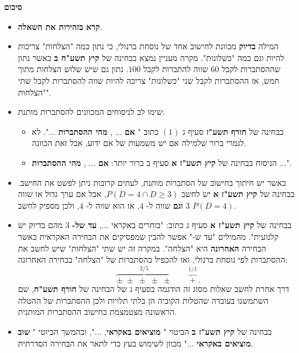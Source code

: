 \documentclass[12pt,a4paper]{article}
\begin{document}

\newpage

\begin{center}
\textbf{סיכום}
\end{center}

\begin{itemize}
\item
\textbf{קרא בזהירות את השאלה}.

\item
המילה 
\textbf{בדיוק}
מכוונת לחישוב אחד של נוסחת ברנולי, כי נתון כמה "הצלחות" צריכות להיות וגם כמה "כשלונות". מקרה מעניין נמצא בבחינה של
\textbf{קיץ תשע"ח ב}
כאשר נתון שההסתברות לקבל 
$60$
שווה להתברות לקבל
$100$.
נתון גם שיש שלוש הצלחות מתוך חמש, אז ההסתברות לקבל שני "כשלונות" צריכה להיות שווה להסתברות לקבל שתי "הצלחות".

\item
שימו לב לניסוחים המכוונים להסתברות מותנת:
\begin{itemize}
\item
בבחינה של
\textbf{חורף תשע"ז}
סעיף ג
$(1)$
כתוב "%
\textbf{אם} $\ldots$ ,
\textbf{מהי ההסתברות} $\ldots$".
לא לגמרי ברור שלמילה אם יש משמעות של אם ידוע, אבל זאת הכוונה.
\item
הניסוח בבחינה של
\textbf{קיץ תשע"ז א}
סעיף ב ברור יותר:
\textbf{אם} $\ldots$ ,
\textbf{מהי ההסתברות} $\ldots$".
\end{itemize}

\item
כאשר יש חיתוך בחישוב של הסתברות מותנת, לעתים קרובות ניתן לפשט את החישב. בבחינה של
\textbf{קיץ תשע"ז א}
יש לחשב
$P(D=4\cap D\ge 3)$,
אבל אם ערך גדול או שווה
$3$
\textbf{וגם}
שווה ל-%
$4$,
אז הוא שווה ל-%
$4$, 
ולכן מספיק לחשב
$P(D=4)$.

\item
 בבחינה של
\textbf{קיץ תשע"ז א}
סעיף ג כתוב: "בוחרים באקראי
$\ldots$,
\textbf{עד של-}
$3$
מהם בדיוק יש קלנועית". מהמילים "עד ש-" אפשר להבין שמפסיקים את הבחירה האקראית כאשר הבחירה 
\textbf{האחרונה} 
היא "הצלחה". במקרה זה יש שתי "הצלחות" שיש לחשב את ההסתברות לפי נוסחת ברנולי, ואז להכפיל בהסתברות של "הצלחה" בבחירה האחרונה:
\[
\overbrace{\pm\;\pm\;\pm\;\pm\;\pm}^{2/5}\quad\quad \overbrace{+}^{1/1}\,.
\]
דרך אחרת לחשב שאלות מסוג זה הודגמה בסעיף ג של הבחינה של
\textbf{חורף תשע"ח},
שם השתמשנו בעובדה שהטלות הקוביה הן בלתי תלויות ולכן ההסתברות של ההטלה הראשונה מצטמצמת בחישוב ההסתברות המותנית.
\item
בבחינה של
\textbf{קיץ תשע"ז ב}
הביטוי "%
\textbf{מוציאים באקראי},
$\ldots$",
ובהמשך הביוטי "%
\textbf{שוב מוציאים באקראי}
$\ldots$"
מכוון לשימוש בעץ כדי לתאר את הבחירה הסדרתית.


\end{itemize}
\end{document}

